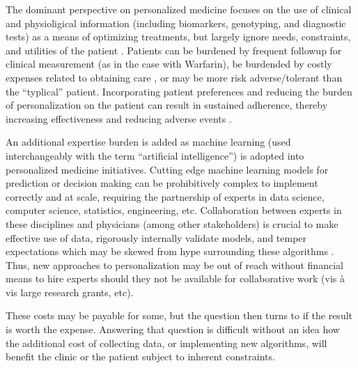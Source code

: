 The dominant perspective on personalized medicine focuses on the use of clinical and physioligical information (including biomarkers, genotyping, and diagnostic tests) as a means of optimizing treatments, but largely ignore needs, constraints, and utilities of the patient \cite{rogowski2015concepts, di2017personalized}. Patients can be burdened by frequent followup for clinical measurement (as in the case with Warfarin), be burdended by costly expenses related to obtaining care  \cite{lee2020assessment}, or may be more risk adverse/tolerant than the ``typlical'' patient. Incorporating patient preferences and reducing the burden of personalization on the patient can result in sustained adherence, thereby increasing effectiveness and reducing adverse events \cite{elliott2008understanding}.

An additional expertise burden is added as machine learning (used interchangeably with the term “artificial intelligence”) is adopted into personalized medicine initiatives.  Cutting edge machine learning models for prediction or decision making can be prohibitively complex to implement correctly and at scale, requiring the partnership of experts in data science, computer science, statistics, engineering, etc.  Collaboration between experts in these disciplines and physicians (among other stakeholders) is crucial to make effective use of data, rigorously internally validate models, and temper expectations which may be skewed from hype surrounding these algorithms \cite{frohlich2018hype}.  Thus, new approaches to personalization may be out of reach without financial means to hire experts should they not be available for collaborative work (vis \`a vis large research grants, etc).  

These costs may be payable for some, but the question then turns to if the result is worth the expense.  Answering that question is difficult without an idea how the additional cost of collecting data, or implementing new algorithms, will benefit the clinic or the patient subject to inherent constraints. 

